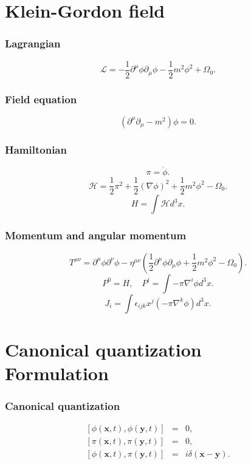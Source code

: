 \section{Klein-Gordon field}
\subsubsection{Lagrangian}
\[\mathcal{L} = -\frac{1}{2} \partial^{\mu} \phi \partial_{\mu} \phi -\frac{1}{2}m^2 \phi^2 + \Omega_0.\]

\subsubsection{Field equation}
\[(\partial^{\mu} \partial_{\mu} - m^2) \phi = 0.\]

\subsubsection{Hamiltonian}
\[\pi = \dot{\phi}.\]
\[\mathcal{H} = \frac{1}{2} \pi^2 + \frac{1}{2} (\nabla \phi)^2 + \frac{1}{2} m^2 \phi^2-\Omega_0.\]
\[H = \int \mathcal{H} d^3 x.\]

\subsubsection{Momentum and angular momentum}
\[T^{\mu \nu} = \partial^{\mu} \phi \partial^{\nu} \phi - \eta^{\mu \nu}(\frac{1}{2}\partial^{\mu}\phi \partial_{\mu} \phi + \frac{1}{2}m^2 \phi^2 -\Omega_0).\]
\[P^0 = H , \quad P^i = \int -\pi \nabla^i \phi d^3 x.\]
\[J_i = \int  \epsilon_{ijk} x^{j} \left(- \pi \nabla^{k} \phi\right) d^3 x.\]

\section{Canonical quantization Formulation}
\subsubsection{Canonical quantization}
\begin{eqnarray}
\left[\phi(\bm{x},t),\phi(\bm{y},t)\right] &=& 0 ,\nonumber \\
\left[\pi(\bm{x},t),\pi(\bm{y},t)\right] &=& 0 ,\nonumber \\
\left[\phi(\bm{x},t),\pi(\bm{y},t)\right] &=& i \delta(\bm{x}-\bm{y}) .\nonumber
\end{eqnarray}

